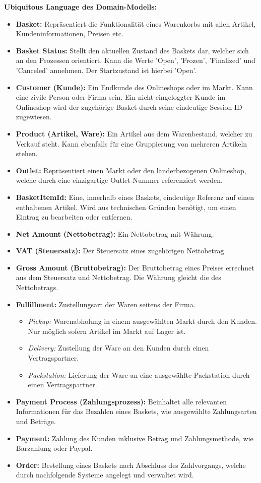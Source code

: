 {\large \textbf{Ubiquitous Language des Domain-Modells:}}
\begin{itemize}[topsep=-3px]
	\item \textbf{Basket: } {Repräsentiert die Funktionalität eines Warenkorbs mit allen Artikel, Kundeninformationen, Preisen etc.}
	\item \textbf{Basket Status: } {Stellt den aktuellen Zustand des Baskets dar, welcher sich an den Prozessen orientiert. Kann die Werte 'Open', 'Frozen', 'Finalized' und 'Canceled' annehmen. Der Startzustand ist hierbei 'Open'.}
	\item \textbf{Customer (Kunde): } {Ein Endkunde des Onlineshops oder im Markt. Kann eine zivile Person oder Firma sein. Ein nicht-eingeloggter Kunde im Onlineshop wird der zugehörige Basket durch seine eindeutige Session-ID zugewiesen.} 
	\item \textbf{Product (Artikel, Ware): } {Ein Artikel aus dem Warenbestand, welcher zu Verkauf steht. Kann ebenfalls für eine Gruppierung von mehreren Artikeln stehen.}
	\item \textbf{Outlet: } {Repräsentiert einen Markt oder den länderbezogenen Onlineshop, welche durch eine einzigartige Outlet-Nummer referenziert werden.}
	\item \textbf{BasketItemId: } {Eine, innerhalb eines Baskets, eindeutige Referenz auf einen enthaltenen Artikel. Wird aus technischen Gründen benötigt, um einen Eintrag zu bearbeiten oder entfernen.}
	\item \textbf{Net Amount (Nettobetrag): } {Ein Nettobetrag mit Währung.}
	\item \textbf{VAT (Steuersatz): } {Der Steuersatz eines zugehörigen Nettobetrag.}
	\item \textbf{Gross Amount (Bruttobetrag): } {Der Bruttobetrag eines Preises errechnet aus dem Steuersatz und Nettobetrag. Die Währung gleicht die des Nettobetrags.}
	\item \textbf{Fulfillment: } {Zustellungsart der Waren seitens der Firma.}
	\begin{itemize}[noitemsep,nolistsep, topsep=-5px]
		\item \textit{Pickup: } {Warenabholung in einem ausgewählten Markt durch den Kunden. Nur möglich sofern Artikel im Markt auf Lager ist.}
		\item \textit{Delivery: } {Zustellung der Ware an den Kunden durch einen Vertragspartner.}
		\item \textit{Packstation: } {Lieferung der Ware an eine ausgewählte Packstation durch einen Vertragspartner.}
	\end{itemize}
	\item \textbf{Payment Process (Zahlungsprozess): } {Beinhaltet alle relevanten Informationen für das Bezahlen eines Baskets, wie ausgewählte Zahlungsarten und Beträge.}
	\item \textbf{Payment: } {Zahlung des Kunden inklusive Betrag und Zahlungsmethode, wie Barzahlung oder Paypal.}
	\item \textbf{Order: } {Bestellung eines Baskets nach Abschluss des Zahlvorgangs, welche durch nachfolgende Systeme angelegt und verwaltet wird.}
\end{itemize}

